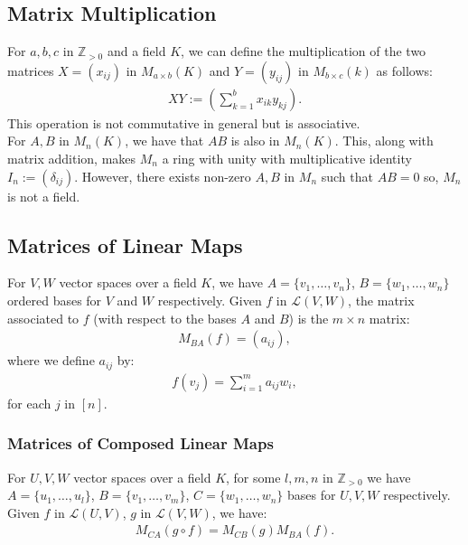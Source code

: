\newpage

\subsection{Matrix Multiplication}

For $a, b, c$ in $\mathbb{Z}_{>0}$ and a field $K$, 
we can define the multiplication of the two matrices $X = (x_{ij})$ in
$M_{a \times b}(K)$ and $Y = (y_{ij})$ in $M_{b \times c}(k)$ as follows: 
\begin{gather*}
  XY := (\sum_{k = 1}^b x_{ik}y_{kj}).
\end{gather*} This operation is not commutative in general but is
associative.
\\[\baselineskip]
For $A, B$ in $M_n(K)$, we have that $AB$ is also in $M_n(K)$. This,
along with matrix addition, makes $M_n$ a ring with unity with
multiplicative identity $I_n := (\delta_{ij})$. However, there exists
non-zero $A, B$ in $M_n$ such that $AB=0$ so, $M_n$ is not a field.

\subsection{Matrices of Linear Maps}

For $V, W$ vector spaces over a field $K$, 
we have $A = \{v_1, \ldots, v_n\}$, $B = \{w_1, \ldots, w_n\}$ 
ordered bases for $V$ and $W$ respectively.
Given $f$ in $\mathcal{L}(V, W)$, the matrix associated to $f$
(with respect to the bases $A$ and $B$) is the $m \times n$ matrix:
\begin{gather*}
  M_{BA}(f) = (a_{ij}),
\end{gather*} where we define $a_{ij}$ by: \begin{gather*}
  f(v_j) = \sum_{i = 1}^m a_{ij}w_i,
\end{gather*} for each $j$ in $[n]$.

\subsubsection{Matrices of Composed Linear Maps}

For $U, V, W$ vector spaces over a field $K$, for some
$l, m, n$ in $\mathbb{Z}_{>0}$ we have $A = \{u_1, \ldots, u_l\}$,
$B = \{v_1, \ldots, v_m\}$, $C = \{w_1, \ldots, w_n\}$ bases for 
$U, V, W$ respectively. Given $f$ in $\mathcal{L}(U, V)$, $g$ 
in $\mathcal{L}(V, W)$, we have:
\begin{gather*}
  M_{CA}(g \circ f) = M_{CB}(g)M_{BA}(f).
\end{gather*}

